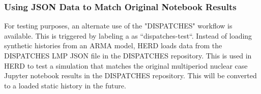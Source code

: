 \subsubsection{Using JSON Data to Match Original Notebook Results}
For testing purposes, an alternate use of the "DISPATCHES" workflow is available. This is triggered by labeling a  as ``dispatches-test``. Instead of loading synthetic histories from an ARMA model, HERD loads data from the DISPATCHES LMP JSON file in the DISPATCHES repository. This is used in HERD to test a simulation that matches the original multiperiod nuclear case Jupyter notebook results in the DISPATCHES repository. This will be converted to a loaded static history in the future. 